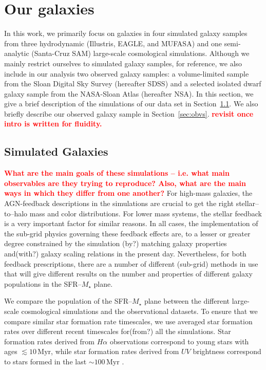 \documentclass[preprint2,tighten]{aastex62}
\newcommand{\todo}[1]{{\bf \textcolor{red}{ #1}}}
\begin{document}
\section{Our galaxies} \label{sec:ourgals}
In this work, we primarily focus on galaxies in four simulated galaxy 
samples from three hydrodynamic (Illustris, EAGLE, and MUFASA) and one 
semi-analytic (Santa-Cruz SAM) large-scale cosmological simulations. 
Although we mainly restrict ourselves to simulated galaxy samples, for 
reference, we also include in our analysis two observed galaxy samples: 
a volume-limited sample from the Sloan Digital Sky Survey (hereafter SDSS) 
and a selected isolated dwarf galaxy sample from the NASA-Sloan Atlas 
(hereafter NSA). In this section, we give a brief description of the 
simulations of our data set in Section~\ref{sec:galsims}. We also briefly
describe our observed galaxy sample in Section~\ref{sec:obvs}. 
\todo{revisit once intro is written for fluidity.}

\subsection{Simulated Galaxies} \label{sec:galsims}
\todo{What are the main goals of these simulations -- i.e. what main observables are they trying to reproduce? Also, what are the main ways in which they differ from one another?}
For high-mass galaxies, the AGN-feedback descriptions in the simulations are crucial to get the right stellar--to--halo mass and color distributions. 
For lower mass systems, the stellar feedback is a very important factor for similar reasons. In all cases, the implementation of the sub-grid physics governing these feedback effects are, to a lesser or greater degree constrained by the simulation (by?) matching galaxy properties and(with?) galaxy scaling relations in the present day. Nevertheless, for both feedback prescriptions, there are a number of different (sub-grid) methods in use that will give different results on the number and properties of different galaxy populations in the SFR--$M_{\star}$ plane. 

We compare the population of the SFR--$M_{\star}$ plane between the different large-scale cosmological simulations and the observational datasets. To ensure that we compare similar star formation rate timescales, we use averaged star formation rates over different recent timescales for(from?) all the simulations. Star formation rates derived from $H{\alpha}$ observations correspond to young stars with ages $\lesssim 10\,\mathrm{Myr}$, while star formation rates derived from $UV$ brightness correspond to stars formed in the last $\sim 100\,\mathrm{Myr}$ \citep[e.g.][]{kennicutt2012}. 
\end{document}
